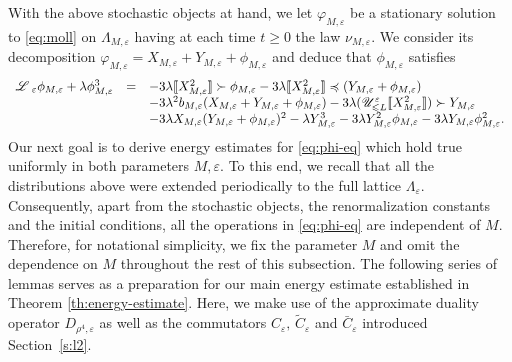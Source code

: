 \documentclass[a4paper,11pt]{article}
\numberwithin{equation}{section}
\newcommand{\LL}{\mathscr{L} \hspace{.2em}}
\newcommand{\UU}{\mathscr{U}}
\begin{document}
With the above stochastic objects at hand, we let $\varphi_{M, \varepsilon}$
be a stationary solution to {\eqref{eq:moll}} on $\Lambda_{M, \varepsilon}$
having at each time $t \geqslant 0$ the law $\nu_{M, \varepsilon}$. We
consider its decomposition $\varphi_{M, \varepsilon} = X_{M, \varepsilon} + Y_{M, \varepsilon} +
  \phi_{M, \varepsilon}$
and deduce that $\phi_{M, \varepsilon}$ satisfies
\begin{equation}
  \begin{array}{lll}
    \LL_{\varepsilon} \phi_{M, \varepsilon} +\lambda \phi_{M, \varepsilon}^3 & = & -
    3\lambda \llbracket X_{M, \varepsilon}^2 \rrbracket \succ \phi_{M, \varepsilon} -
    3\lambda \llbracket X_{M, \varepsilon}^2 \rrbracket \preccurlyeq (Y_{M,
    \varepsilon} + \phi_{M, \varepsilon})\\
    &  & - 3\lambda^2 b_{M, \varepsilon} (X_{M, \varepsilon} + Y_{M, \varepsilon} +
    \phi_{M, \varepsilon}) - 3\lambda ( \UU^{\varepsilon}_{\leqslant L}
    \llbracket X_{M, \varepsilon}^2 \rrbracket ) \succ Y_{M,
    \varepsilon}\\
    &  & - 3\lambda X_{M, \varepsilon} (Y_{M, \varepsilon} + \phi_{M,
    \varepsilon})^2 -\lambda Y_{M, \varepsilon}^3 - 3\lambda Y_{M, \varepsilon}^2 \phi_{M,
    \varepsilon} - 3\lambda Y_{M, \varepsilon} \phi_{M, \varepsilon}^2 .
  \end{array} \label{eq:phi-eq}
\end{equation}
Our next goal is to derive energy estimates for {\eqref{eq:phi-eq}} which hold
true uniformly in both parameters $M, \varepsilon$. To this end, we recall
that all the distributions above were extended periodically to the full
lattice $\Lambda_{\varepsilon}$. Consequently, apart from the stochastic
objects, the renormalization constants and the initial conditions, all the
operations in {\eqref{eq:phi-eq}} are independent of $M$. Therefore, for
notational simplicity, we fix the parameter $M$ and omit the dependence on $M$
throughout the rest of this subsection. The following series of lemmas serves
as a preparation for our main energy estimate established in Theorem
\ref{th:energy-estimate}. Here, we make use of the approximate duality operator $D_{\rho^{4},\varepsilon}$ as well as the commutators $C_{\varepsilon},\,\tilde C_{\varepsilon}$ and $\bar C_{\varepsilon}$ introduced Section~\ref{s:l2}.
\end{document}
